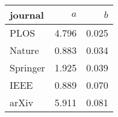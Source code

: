 \begin{tabular}{lrr}
\toprule
journal &    $a$ &   $b$ \\
\midrule
PLOS &  4.796 &  0.025 \\
Nature &  0.883 &  0.034 \\
Springer &  1.925 &  0.039 \\
IEEE &  0.889 &  0.070 \\
arXiv &  5.911 &  0.081 \\
\bottomrule
\end{tabular}
